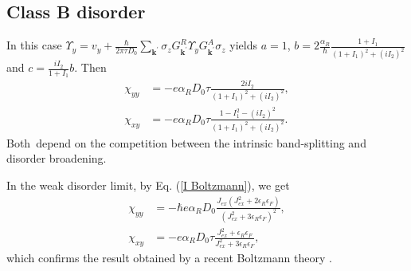 \documentclass
[aps,pra,amsfonts,amssymb,twocolumn,amsmath,preprintnumbers,nofootinbib,floatfix,
showpacs,superscriptaddress]{revtex4-1}%
\begin{document}
\subsection{Class B disorder}

In this case $\Upsilon_{y}=v_{y}+\frac{\hbar}{2\pi\tau D_{0}}\sum
_{\mathbf{k}^{\prime}}\sigma_{z}G_{\mathbf{k}^{\prime}}^{R}\Upsilon
_{y}G_{\mathbf{k}^{\prime}}^{A}\sigma_{z}$ yields $a=1$, $b=2\frac{\alpha_{R}%
}{\hbar}\frac{1+I_{1}}{\left(  1+I_{1}\right)  ^{2}+\left(  iI_{2}\right)
^{2}}$ and $c=\frac{iI_{2}}{1+I_{1}}b$. Then%
\begin{align}
\chi_{yy}  &  =-e\alpha_{R}D_{0}\tau\frac{2iI_{2}}{\left(  1+I_{1}\right)
^{2}+\left(  iI_{2}\right)  ^{2}},\nonumber\\
\chi_{xy}  &  =-e\alpha_{R}D_{0}\tau\frac{1-I_{1}^{2}-\left(  iI_{2}\right)
^{2}}{\left(  1+I_{1}\right)  ^{2}+\left(  iI_{2}\right)  ^{2}}.
\label{SOT B gen}%
\end{align}
Both\ depend on the competition between the intrinsic band-splitting and
disorder broadening.

In the weak disorder limit, by Eq. (\ref{I Boltzmann}), we get%
\begin{align}
\chi_{yy}  &  =-\hbar e\alpha_{R}D_{0}\frac{J_{ex}\left(  J_{ex}^{2}%
+2\epsilon_{R}\epsilon_{F}\right)  }{\left(  J_{ex}^{2}+3\epsilon_{R}%
\epsilon_{F}\right)  ^{2}},\nonumber\\
\chi_{xy}  &  =-e\alpha_{R}D_{0}\tau\frac{J_{ex}^{2}+\epsilon_{R}\epsilon_{F}%
}{J_{ex}^{2}+3\epsilon_{R}\epsilon_{F}}, \label{SOT B Boltzmann}%
\end{align}
which confirms the result obtained by a recent Boltzmann theory
\cite{Xiao2017SOT}.
\end{document}
